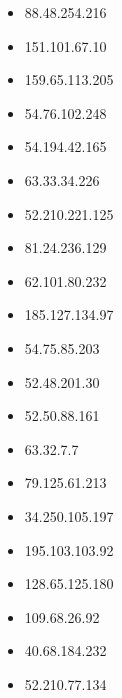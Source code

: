 \documentclass{article}
\begin{document}
\begin{itemize}
    
        
            \item 88.48.254.216
        
            \item 151.101.67.10
        
            \item 159.65.113.205
        
            \item 54.76.102.248
        
            \item 54.194.42.165
        
            \item 63.33.34.226
        
            \item 52.210.221.125
        
            \item 81.24.236.129
        
            \item 62.101.80.232
        
            \item 185.127.134.97
        
            \item 54.75.85.203
        
            \item 52.48.201.30
        
            \item 52.50.88.161
        
            \item 63.32.7.7
        
            \item 79.125.61.213
        
            \item 34.250.105.197
        
            \item 195.103.103.92
        
            \item 128.65.125.180
        
            \item 109.68.26.92
        
            \item 40.68.184.232
        
            \item 52.210.77.134
        

\end{itemize}
\end{document}
